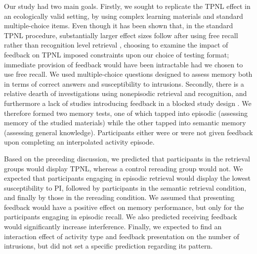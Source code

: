 \documentclass[../main.tex]{subfiles}
\begin{document}
Our study had two main goals. Firstly, we sought to replicate the TPNL 
effect in an ecologically valid setting, by using complex learning materials 
and standard multiple-choice items. Even though it has been shown that, in 
the standard TPNL procedure, substantially larger effect sizes follow after 
using free recall rather than recognition level retrieval 
 \citep{chanRetrievalPotentiatesNew2018}, choosing to examine the impact of 
 feedback on TPNL imposed constraints upon our choice of testing format; 
 immediate provision of feedback would have been intractable had we chosen 
 to use free recall. We used multiple-choice questions designed to assess 
 memory both in terms of correct answers and susceptibility to intrusions. 
 Secondly, there is a relative dearth of investigations using nonepisodic 
 retrieval and recognition, and furthermore a lack of studies introducing 
 feedback in a blocked study design 
\cite{chanRetrievalPotentiatesNew2018}. We therefore formed two memory 
tests, one of which tapped into episodic (assessing memory of the studied 
materials) while the other tapped into semantic memory (assessing general 
knowledge). Participants either were or were not given feedback upon 
completing an interpolated activity episode.

Based on the preceding discussion, we predicted that participants in the 
retrieval groups would display TPNL, whereas a control rereading group would 
not. We expected that participants engaging in episodic retrieval would 
display the lowest susceptibility to PI, followed by participants in the 
semantic retrieval condition, and finally by those in the rereading 
condition. We assumed that presenting feedback would have a positive effect 
on memory performance, but only for the participants engaging in episodic 
recall. We also predicted receiving feedback would significantly increase 
interference. Finally, we expected to find an interaction effect of activity 
type and feedback presentation on the number of intrusions, but did not set 
a specific prediction regarding its pattern.
 
{
	\biblio
}
\end{document}
